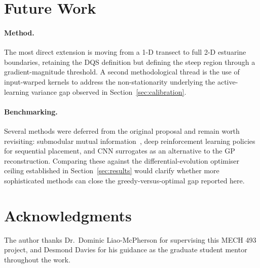 \documentclass[11pt,letterpaper]{article}
\begin{document}
\section*{Future Work}
\label{sec:future}

\paragraph{Method.} The most direct extension is moving from a 1-D
transect to full 2-D estuarine boundaries, retaining the DQS
definition but defining the steep region through a gradient-magnitude
threshold. A second methodological thread is the use of input-warped
kernels to address the non-stationarity underlying the
active-learning variance gap observed in
Section~\ref{sec:calibration}.

\paragraph{Benchmarking.} Several methods were deferred from the
original proposal and remain worth revisiting: submodular mutual
information~\citep{krause2008near}, deep reinforcement learning
policies for sequential placement, and CNN surrogates as an
alternative to the GP reconstruction. Comparing these against the
differential-evolution optimiser ceiling established in
Section~\ref{sec:results} would clarify whether more sophisticated
methods can close the greedy-versus-optimal gap reported here.
\section*{Acknowledgments}
The author thanks Dr.\ Dominic Liao-McPherson for supervising this
MECH 493 project, and Desmond Davies for his guidance as
the graduate student mentor throughout the work. 

\newpage
\renewcommand{\bibsection}{\section{References}\label{sec:references}}

\end{document}
